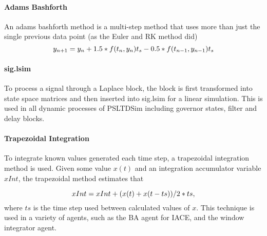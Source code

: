 \documentclass[12pt]{article}
\begin{document}
\paragraph{Adams Bashforth}
An adams bashforth method is a multi-step method that uses more than just the single previous data point (as the Euler and RK method did)
\begin{equation}{\label{eq: ab int} }
y_{n+1} = y_n + 1.5*f(t_n, y_n)t_s- 0.5*f(t_{n-1}, y_{n-1})t_s
\end{equation}%

\paragraph{sig.lsim}
To process a signal through a Laplace block, the block is first transformed into state space matrices and then inserted into sig.lsim for a linear simulation.
This is used in all dynamic processes of PSLTDSim including governor states, filter and delay blocks.



\paragraph{Trapezoidal Integration}
To integrate known values generated each time step, a trapezoidal integration method is used.
Given some value $x(t)$ and an integration accumulator variable $xInt$, the trapezoidal method estimates that

\begin{equation}{\label{eq: trapezoidal int} }
xInt = xInt + ( x(t)+x(t-ts) )/2 * ts,
\end{equation}%
where $ts$ is the time step used between calculated values of $x$.
This technique is used in a variety of agents, such as the BA agent for IACE, and the window integrator agent. 
\end{document}
